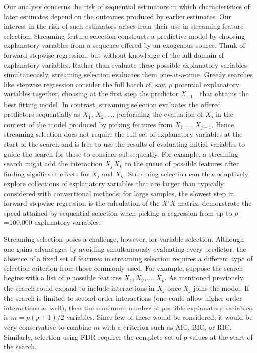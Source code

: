 \documentclass[12pt]{article}
\begin{document}
 Our analysis concerns the risk of sequential estimators in which
 characteristics of later estimates depend on the outcomes produced by earlier
 estimates.  Our interest in the risk of such estimators arises from their use
 in streaming feature selection.  Streaming feature selection constructs a
 predictive model by choosing explanatory variables from a sequence offered by
 an exogenous source.  Think of forward stepwise regression, but without
 knowledge of the full domain of explanatory variables.  Rather than evaluate
 these possible explanatory variables simultaneously, streaming selection
 evaluates them one-at-a-time.  Greedy searches like stepwise regression consider
 the full batch of, say, $p$ potential explanatory variables together, choosing
 at the first step the predictor $X_{(1)}$ that obtains the best fitting model.
  In contrast, streaming selection evaluates the offered predictors sequentially
 as $X_1, \, X_2, \ldots$, performing the evaluation of $X_j$ in the context of
 the model produced by picking features from $X_1, \ldots, X_{j-1}$.  Hence,
 streaming selection does not require the full set of explanatory variables at
 the start of the search and is free to use the results of evaluating initial
 variables to guide the search for those to consider subsequently.  For example,
 a streaming search might add the interaction $X_j \, X_k$ to the queue of
 possible features after finding significant effects for $X_j$ and $X_k$.
  Streaming selection can thus adaptively explore collections of explanatory
 variables that are larger than typically considered with conventional methods;
 for large samples, the slowest step in forward stepwise regression is the
 calculation of the $X'X$ matrix.  \citet{fosterlin10} demonstrate the speed
 attained by sequential selection when picking a regression from up to
 $p$=100,000 explanatory variables.


 Streaming selection poses a challenge, however, for variable selection.
  Although one gains advantages by avoiding simultaneously evaluating every
 predictor, the absence of a fixed set of features in streaming selection
 requires a different type of selection criterion from those commonly used.  For
 example, suppose the search begins with a list of $p$ possible features $X_1,
 X_2, \ldots, X_p$.  As mentioned previously, the search could expand to include
 interactions in $X_j$ once $X_j$ joins the model.  If the search is limited to
 second-order interactions (one could allow higher order interactions as well),
 then the maximum number of possible explanatory variables is $m = p(p+1)/2$
 variables.  Since few of these would be considered, it would be very
 conservative to combine $m$ with a criterion such as AIC, BIC, or RIC.
  Similarly, selection using FDR requires the complete set of $p$-values at the
 start of the search.
\end{document}
